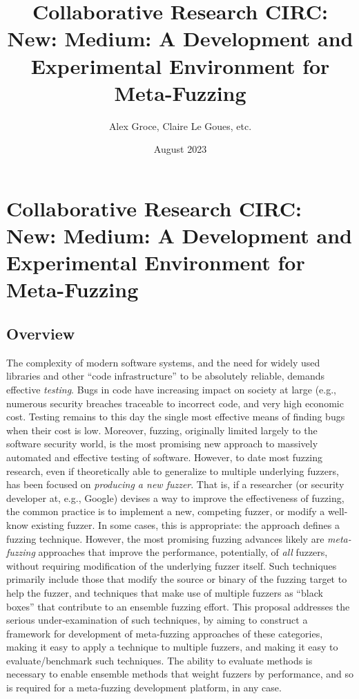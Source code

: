 \documentclass[numbers]{proposalnsf}
\title{Collaborative Research CIRC: New: Medium: A Development and Experimental Environment for Meta-Fuzzing}
\author{Alex Groce, Claire Le Goues, etc.}
\date{August 2023}
\begin{document}
\section*{Collaborative Research CIRC: New: Medium: A Development and Experimental Environment for Meta-Fuzzing}

\subsection*{Overview}
\vspace{-2mm}


The complexity of modern software systems, and the need for widely used libraries and other ``code infrastructure'' to be absolutely reliable, demands effective \emph{testing}.  Bugs in code have increasing impact on society at large (e.g., numerous security breaches traceable to incorrect code, and very high economic cost.  Testing remains to this day the single most effective means of finding bugs when their cost is low.   Moreover, fuzzing, originally limited largely to the software security world, is the most promising new approach to massively automated and effective testing of software.   However, to date most fuzzing research, even if theoretically able to generalize to multiple underlying fuzzers, has been focused on \emph{producing a new fuzzer}.  That is, if a researcher (or security developer at, e.g., Google) devises a way to improve the effectiveness of fuzzing, the common practice is to implement a new, competing fuzzer, or modify a well-know existing fuzzer.  In some cases, this is appropriate: the approach defines a fuzzing technique.  However, the most promising fuzzing advances likely are \emph{meta-fuzzing} approaches that improve the performance, potentially, of \emph{all} fuzzers, without requiring modification of the underlying fuzzer itself.  Such techniques primarily include those that modify the source or binary of the fuzzing target to help the fuzzer, and techniques that make use of multiple fuzzers as ``black boxes'' that contribute to an ensemble fuzzing effort.  This proposal addresses the serious under-examination of such techniques, by aiming to construct a framework for development of meta-fuzzing approaches of these categories, making it easy to apply a technique to multiple fuzzers, and making it easy to evaluate/benchmark such techniques.  The ability to evaluate methods is necessary to enable ensemble methods that weight fuzzers by performance, and so is required for a meta-fuzzing development platform, in any case.
\end{document}
